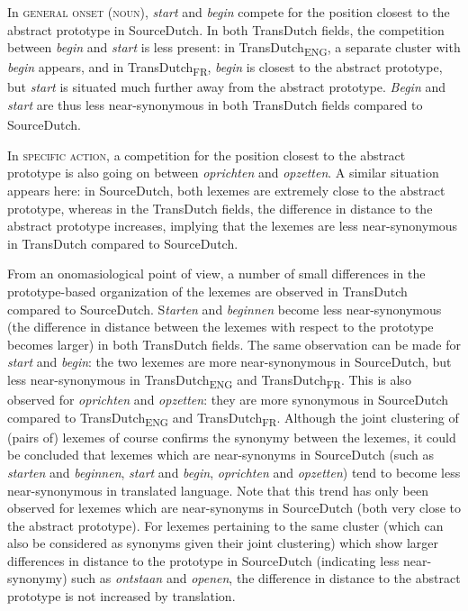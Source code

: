 In \textsc{general onset} (\textsc{noun}), \textit{start} and \textit{begin} compete for the position closest to the abstract prototype in SourceDutch. In both TransDutch fields, the competition between \textit{begin} and \textit{start} is less present: in TransDutch\textsubscript{ENG}, a separate cluster with \textit{begin} appears, and in TransDutch\textsubscript{FR}, \textit{begin} is closest to the abstract prototype, but \textit{start} is situated much further away from the abstract prototype. \textit{Begin} and \textit{start} are thus less near-synonymous in both TransDutch\textsubscript{} fields compared to SourceDutch.

In {\textsc{specific}} \textsc{action}, a competition for the position closest to the abstract prototype is also going on between \textit{oprichten} and \textit{opzetten}. A similar situation appears here: in SourceDutch, both lexemes are extremely close to the abstract prototype, whereas in the TransDutch fields, the difference in distance to the abstract prototype increases, implying that the lexemes are less near-synonymous in TransDutch compared to SourceDutch.

From an onomasiological point of view, a number of small differences in the prototype-based organization of the lexemes are observed in TransDutch compared to SourceDutch. S\textit{tarten} and \textit{beginnen} become less near-synonymous (the difference in distance between the lexemes with respect to the prototype becomes larger) in both TransDutch fields. The same observation can be made for \textit{start} and \textit{begin}: the two lexemes are more near-synonymous in SourceDutch, but less near-synonymous in TransDutch\textsubscript{ENG} and TransDutch\textsubscript{FR}. This is also observed for \textit{oprichten} and \textit{opzetten}: they are more synonymous in SourceDutch compared to TransDutch\textsubscript{ENG} and TransDutch\textsubscript{FR}. Although the joint clustering of (pairs of) lexemes of course confirms the synonymy between the lexemes, it could be concluded that lexemes which are near-synonyms in SourceDutch (such as \textit{starten} and \textit{beginnen}, \textit{start} and \textit{begin}, \textit{oprichten} and \textit{opzetten}) tend to become less near-synonymous in translated language. Note that this trend has only been observed for lexemes which are near-synonyms in SourceDutch (both very close to the abstract prototype). For lexemes pertaining to the same cluster (which can also be considered as synonyms given their joint clustering) which show larger differences in distance to the prototype in SourceDutch (indicating less near-synonymy) such as \textit{ontstaan} and \textit{openen}, the difference in distance to the abstract prototype is not increased by translation.

